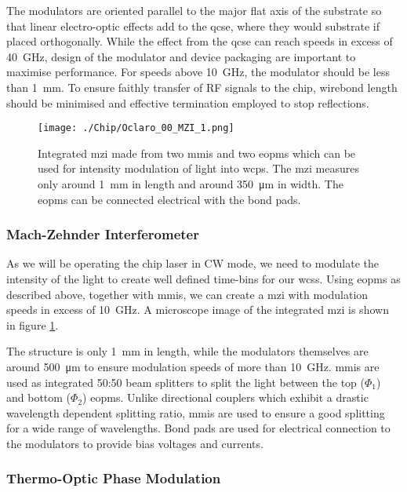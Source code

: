 The modulators are oriented parallel to the major flat axis of the substrate so that linear electro-optic effects add to the \ac{qcse}, where they would substrate if placed orthogonally. While the effect from the \ac{qcse} can reach speeds in excess of \SI{40}{GHz}, design of the modulator and device packaging are important to maximise performance. For speeds above \SI{10}{GHz}, the modulator should be less than \SI{1}{mm}. To ensure faithly transfer of RF signals to the chip, wirebond length should be minimised and effective termination employed to stop reflections.

\begin{figure}[tp]
	\centering
	\texttt{[image: ./Chip/Oclaro\_00\_MZI\_1.png]}
	\caption[Microscope image of an integrated Mach-Zehnder interferometer]{Integrated \acl{mzi} made from two \acsp{mmi} and two \acsp{eopm} which can be used for intensity modulation of light into \acp{wcp}. The \ac{mzi} measures only around \SI{1}{\mm} in length and around \SI{350}{\micro\metre} in width. The \acp{eopm} can be connected electrical with the bond pads.}
	\label{fig:InP_MZI}
\end{figure}

\subsubsection{Mach-Zehnder Interferometer}

As we will be operating the chip laser in \ac{CW} mode, we need to modulate the intensity of the light to create well defined time-bins for our \acp{wcs}. Using \acp{eopm} as described above, together with \acp{mmi}, we can create a \ac{mzi} with modulation speeds in excess of \SI{10}{GHz}. A microscope image of the integrated \ac{mzi} is shown in figure \ref{fig:InP_MZI}.

The structure is only \SI{1}{mm} in length, while the modulators themselves are around \SI{500}{\um} to ensure modulation speeds of more than \SI{10}{GHz}. \Acp{mmi} are used as integrated {50:50} beam splitters to split the light between the top ($\Phi_1$) and bottom ($\Phi_2$) \acp{eopm}. Unlike directional couplers which exhibit a drastic wavelength dependent splitting ratio, \acp{mmi} are used to ensure a good splitting for a wide range of wavelengths. Bond pads are used for electrical connection to the modulators to provide bias voltages and currents.

\subsubsection{Thermo-Optic Phase Modulation}

